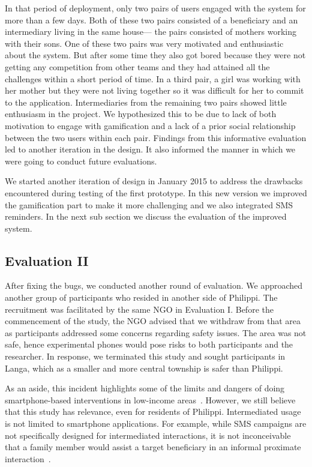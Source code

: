 \documentclass{sig-alternate}
\begin{document}
In that period of deployment, only two pairs of users engaged with the system
for more than a few days. Both of these two pairs consisted of a beneficiary 
and an  intermediary
living in the same house--- the pairs consisted of mothers working with their
sons. One of these two pairs was very motivated and enthusiastic about the
system. But after some time they also got bored because they were not getting
any competition from other teams and they had attained all the challenges
within a short period of time. In a third pair, a girl was working with her
mother but they were not living together so it was difficult for her to commit
to the application. Intermediaries from the remaining two pairs showed
little enthusiasm in the project. We hypothesized this to be due to lack of both
motivation to engage with gamification and a lack of a prior social relationship 
between
the two users within each pair. Findings from this informative evaluation led to
another iteration in the design. It also informed the manner in which we were
going to conduct future evaluations.

We started another iteration of design in January 2015 to address the
drawbacks encountered during testing of the first prototype. In this new
version we improved the gamification part to make it more challenging and we
also integrated SMS reminders. In the next sub section we discuss the
evaluation of the improved system.
 
\subsection{Evaluation II}
After fixing the bugs, we conducted another round of evaluation. We approached
another group of participants who resided in another side of Philippi. The
recruitment was facilitated by the same NGO in Evaluation I. Before the
commencement of the study, the NGO advised that we withdraw from that area as
participants addressed some concerns regarding safety issues. The area was not
safe, hence experimental phones would pose risks to both participants and the
researcher. In response, we terminated this study and sought participants in 
Langa, which as a smaller and more central township is safer than Philippi.

As an aside, this incident highlights some of the limits and dangers of doing 
smartphone-based interventions in low-income areas~\cite{Molapo2015}.  
However, we still believe that this study has relevance, even for residents of Philippi.  Intermediated usage is not limited to smartphone applications. For example, while SMS campaigns are not specifically designed for intermediated interactions, it is
not inconceivable that a family member would assist a target beneficiary
in an informal proximate interaction~\cite{sambasivan2010}.
\end{document}
